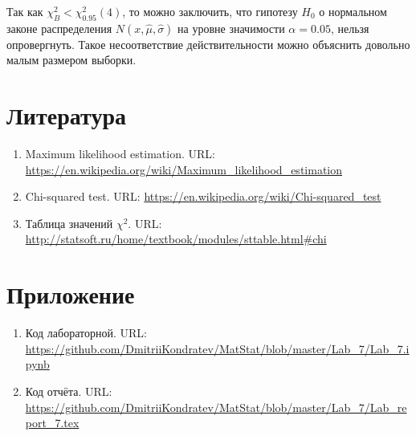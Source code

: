 \documentclass[12pt,a4paper]{article}
\begin{document}
	Так как $\chi^2_B < \chi^2_{0.95}(4)$, то можно заключить, что гипотезу $H_0$ о нормальном законе распределения $N(x, \hat{\mu}, \hat{\sigma})$ на уровне значимости $\alpha = 0.05$, нельзя опровергнуть. Такое несоответствие действительности можно объяснить довольно малым размером выборки.
	
	\section{Литература}
	\begin{enumerate}		
		\item Maximum likelihood estimation. URL: \url{https://en.wikipedia.org/wiki/Maximum_likelihood_estimation}
		
		\item Chi-squared test. URL: \url{https://en.wikipedia.org/wiki/Chi-squared_test}
		
		\item Таблица значений $\chi^2$. URL: \url{http://statsoft.ru/home/textbook/modules/sttable.html#chi}
	\end{enumerate}

	\section{Приложение}
	\begin{enumerate}
		\item Код лабораторной. URL: \url{https://github.com/DmitriiKondratev/MatStat/blob/master/Lab_7/Lab_7.ipynb}
		
		\item Код отчёта. URL: \url{https://github.com/DmitriiKondratev/MatStat/blob/master/Lab_7/Lab_report_7.tex}
		
	\end{enumerate}
\end{document}
